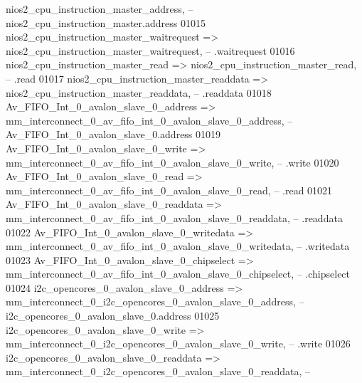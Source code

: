 \begin{DoxyCode}
      nios2_cpu_instruction_master_address,\textcolor{keyword}{                        --         
       nios2\_cpu\_instruction\_master.address}
01015             nios2\_cpu\_instruction\_master\_waitrequest    => 
      nios2_cpu_instruction_master_waitrequest,\textcolor{keyword}{                    --                                     
       .waitrequest}
01016             nios2\_cpu\_instruction\_master\_read           => 
      nios2_cpu_instruction_master_read,\textcolor{keyword}{                           --                                      .read}
01017             nios2\_cpu\_instruction\_master\_readdata       => 
      nios2_cpu_instruction_master_readdata,\textcolor{keyword}{                       --                                     
       .readdata}
01018             Av\_FIFO\_Int\_0\_avalon\_slave\_0\_address        => 
      mm_interconnect_0_av_fifo_int_0_avalon_slave_0_address,\textcolor{keyword}{      --         
       Av\_FIFO\_Int\_0\_avalon\_slave\_0.address}
01019             Av\_FIFO\_Int\_0\_avalon\_slave\_0\_write          => 
      mm_interconnect_0_av_fifo_int_0_avalon_slave_0_write,\textcolor{keyword}{        --                                      .write}
01020             Av\_FIFO\_Int\_0\_avalon\_slave\_0\_read           => 
      mm_interconnect_0_av_fifo_int_0_avalon_slave_0_read,\textcolor{keyword}{         --                                      .read}
01021             Av\_FIFO\_Int\_0\_avalon\_slave\_0\_readdata       => 
      mm_interconnect_0_av_fifo_int_0_avalon_slave_0_readdata,\textcolor{keyword}{     --                                     
       .readdata}
01022             Av\_FIFO\_Int\_0\_avalon\_slave\_0\_writedata      => 
      mm_interconnect_0_av_fifo_int_0_avalon_slave_0_writedata,\textcolor{keyword}{    --                                     
       .writedata}
01023             Av\_FIFO\_Int\_0\_avalon\_slave\_0\_chipselect     => 
      mm_interconnect_0_av_fifo_int_0_avalon_slave_0_chipselect,\textcolor{keyword}{   --                                     
       .chipselect}
01024             i2c\_opencores\_0\_avalon\_slave\_0\_address      => 
      mm_interconnect_0_i2c_opencores_0_avalon_slave_0_address,\textcolor{keyword}{    --       
       i2c\_opencores\_0\_avalon\_slave\_0.address}
01025             i2c\_opencores\_0\_avalon\_slave\_0\_write        => 
      mm_interconnect_0_i2c_opencores_0_avalon_slave_0_write,\textcolor{keyword}{      --                                      .write}
01026             i2c\_opencores\_0\_avalon\_slave\_0\_readdata     => 
      mm_interconnect_0_i2c_opencores_0_avalon_slave_0_readdata,\textcolor{keyword}{   --                                     
}
\end{DoxyCode}
